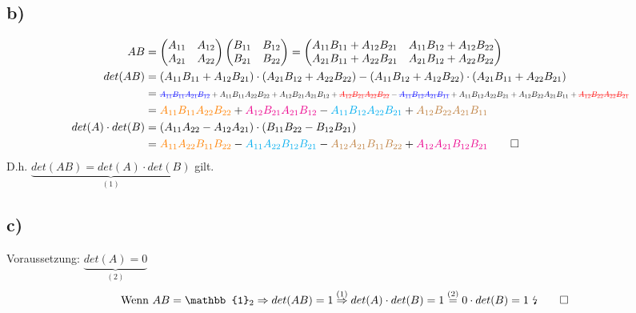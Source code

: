 \documentclass[titlepage]{article}
\newcommand{\1}{\mathbb{1}}
\newcommand{\0}{\mathbb{0}}
\begin{document}
		\subsection*{b)}
			\begin{align*}
				AB&=
				\begin{pmatrix}A_{11}&A_{12}\\A_{21}&A_{22}\end{pmatrix}
				\begin{pmatrix}B_{11}&B_{12}\\B_{21}&B_{22}\end{pmatrix}
				=
				\begin{pmatrix}A_{11}B_{11}+A_{12}B_{21}&A_{11}B_{12}+A_{12}B_{22}\\A_{21}B_{11}+A_{22}B_{21}&A_{21}B_{12}+A_{22}B_{22}\end{pmatrix}\\
				det(AB)&=(A_{11}B_{11}+A_{12}B_{21})\cdot (A_{21}B_{12}+A_{22}B_{22})-(A_{11}B_{12}+A_{12}B_{22})\cdot (A_{21}B_{11}+A_{22}B_{21})\\
				&=\text{\scalebox{0.7}{$\textcolor{blue}{\text{\sout{$A_{11}B_{11}A_{21}B_{12}$}}}+A_{11}B_{11}A_{22}B_{22}+A_{12}B_{21}A_{21}B_{12}+\textcolor{red}{\text{\sout{$A_{12}B_{21}A_{22}B_{22}$}}}-\textcolor{blue}{\text{\sout{$A_{11}B_{12}A_{21}B_{11}$}}}+A_{11}B_{12}A_{22}B_{21}+A_{12}B_{22}A_{21}B_{11}+\textcolor{red}{\text{\sout{$A_{12}B_{22}A_{22}B_{21}$}}}$}}\\
				&=\textcolor{orange}{A_{11}B_{11}A_{22}B_{22}}+\textcolor{magenta}{A_{12}B_{21}A_{21}B_{12}}-\textcolor{cyan}{A_{11}B_{12}A_{22}B_{21}}+\textcolor{brown}{A_{12}B_{22}A_{21}B_{11}}\\
				det(A)\cdot det(B)&=(A_{11}A_{22}-A_{12}A_{21})\cdot (B_{11}B_{22}-B_{12}B_{21})\\
				&=\textcolor{orange}{A_{11}A_{22}B_{11}B_{22}}- \textcolor{cyan}{A_{11}A_{22}B_{12}B_{21}}-\textcolor{brown}{A_{12}A_{21}B_{11}B_{22}}+\textcolor{magenta}{A_{12}A_{21}B_{12}B_{21}}\qed
			\end{align*}
		D.h. $\underbrace{det(AB)=det(A)\cdot det(B)}_{(1)}$ gilt.
		\subsection*{c)}
		Voraussetzung: $\underbrace{det(A)=0}_{(2)}$
			\begin{align*}
				\text{Wenn }AB=\1_2\Rightarrow det(AB)=1\overset{(1)}{\Rightarrow} det(A)\cdot det(B)=1\overset{(2)}{=}0\cdot det(B)&=1\text{ \lightning}\qed
			\end{align*}
\end{document}
